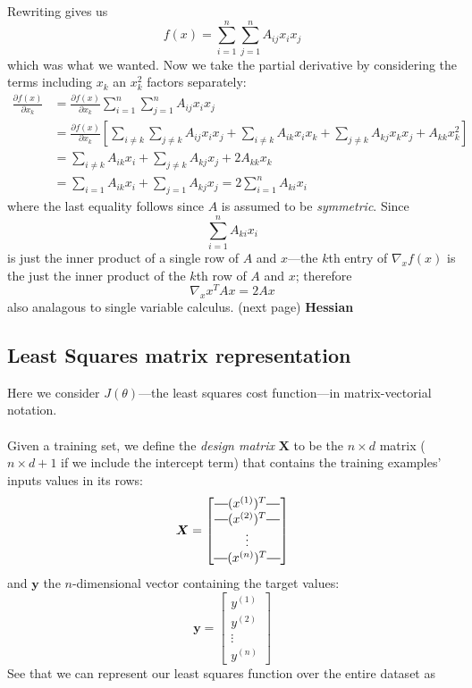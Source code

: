 \documentclass{report}
\newcommand*{\horzbar}{\rule[.5ex]{2.5ex}{0.5pt}} %
\begin{document}
Rewriting gives us
\begin{equation*}
f(x)=\sum^n_{i=1}\sum^n_{j=1}A_{ij}x_ix_j
\end{equation*}
which was what we wanted. Now we take the partial derivative by considering the terms including $x_k$ an
$x_k^2$ factors separately:
\begin{align*}
\frac{\partial f(x)}{\partial x_k}&=\frac{\partial f(x)}{\partial x_k}\sum^n_{i=1}\sum^n_{j=1}A_{ij}x_ix_j\\
&=\frac{\partial f(x)}{\partial x_k}\left[\sum_{i\neq k}
\sum_{j\neq k}A_{ij}x_ix_j+\sum_{i\neq k}A_{ik}x_ix_k
+\sum_{j\neq k}A_{kj}x_kx_j+A_{kk}x_k^2\right]\\
&=\sum_{i\neq k}A_{ik}x_i+\sum_{j\neq k}A_{kj}x_j+2A_{kk}x_k\\
&=\sum_{i=1}A_{ik}x_i+\sum_{j=1}A_{kj}x_j=2\sum^n_{i=1}A_{ki}x_i
\end{align*}
where the last equality follows since $A$ is assumed to be \textit{symmetric}. Since 
\begin{equation*}
\sum^n_{i=1}A_{ki}x_i
\end{equation*}
is just the inner product of a single row of $A$ and $x$---the $k$th entry of $\nabla_xf(x)$ is the just the 
inner product of the $k$th row of $A$ and $x$; therefore 
\begin{equation*}
\nabla_xx^TAx=2Ax
\end{equation*}
also analagous to single variable calculus.
(next page)
\newpage
\noindent\textbf{Hessian}

\newpage

\subsection{Least Squares matrix representation}
Here we consider $J(\theta)$---the least squares cost function---in matrix-vectorial notation.\\
\vspace{1mm}\\
Given a training set, we define the \textit{design matrix} $\bm{X}$ to be the $n\times d$ matrix ($n\times d+1$ if we
include the intercept term) that contains the training examples' inputs values in its rows:
\begin{equation*}
\bm{X}=\begin{bmatrix}
\horzbar(x^{(1)})^T\horzbar\\
\horzbar(x^{(2)})^T\horzbar\\
\vdots\\\horzbar(x^{(n)})^T\horzbar
\end{bmatrix}
\end{equation*}
and $\bm{y}$ the $n$-dimensional vector containing the target values:
\begin{equation*}
\bm{y}=\begin{bmatrix}
y^{(1)}\\y^{(2)}\\\vdots\\y^{(n)}
\end{bmatrix}
\end{equation*}
See that we can represent our least squares function over the entire dataset as
\end{document}
